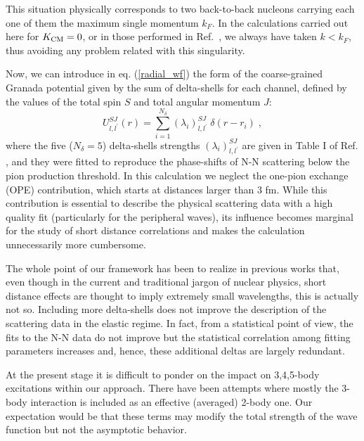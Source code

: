 \documentclass[aps,twocolumn,showpacs,preprintnumbers,amsmath,amssymb,nofootinbib,superscriptaddress,showkeys,noeprint]{revtex4-1}
\begin{document}
This situation physically corresponds to two back-to-back nucleons
carrying each one of them the maximum single momentum $k_F$. In the
calculations carried out here for $K_{\rm CM}=0$, or in those
performed in Ref.~\cite{RuizSimo:2017tcb}, we always have taken
$k<k_F$, thus avoiding any problem related with this singularity.

Now, we can introduce in eq. (\ref{radial_wf}) the form of the
coarse-grained Granada potential given by the sum of delta-shells for
each channel, defined by the values of the total spin $S$ and total
angular momentum $J$:
\begin{equation}\label{delta-shells}
U^{SJ}_{l,l^\prime}(r)= \sum^{N_\delta}_{i=1}
\left(\lambda_i \right)^{SJ}_{l,l^\prime}\; \delta(r-r_i)\;,
\end{equation}
where the five ($N_\delta=5$) delta-shells strengths $\left(\lambda_i
\right)^{SJ}_{l,l^\prime}$ are given in Table I of
Ref. \cite{Perez:2013mwa}, and they were fitted to reproduce the
phase-shifts of N-N scattering below the pion production threshold.
In this calculation we neglect the one-pion exchange (OPE)
contribution, which starts at distances larger than $3$ fm. While this
contribution is essential to describe the physical scattering data
with a high quality fit (particularly for the peripheral waves), its
influence becomes marginal for the study of short distance
correlations and makes the calculation unnecessarily more cumbersome.

The whole point of our framework has been to realize in previous works
that, even though in the current and traditional jargon of nuclear
physics, short distance effects are thought to imply extremely small
wavelengths, this is actually not so.  Including more delta-shells
does not improve the description of the scattering data in the elastic
regime. In fact, from a statistical point of view, the fits to the N-N
data do not improve but the statistical correlation among fitting
parameters increases and, hence, these additional deltas are largely
redundant.


At the present stage it is difficult to ponder on the impact on
3,4,5-body excitations within our approach.  There have been attempts
where mostly the 3-body interaction is included \cite{Moeini:2022fsf,
  HeYeTongLang:2013ihv, Kohno:2012vj, Lovato:2010ef,
  Holt:2009ty,Barnea:2004ac} as an effective (averaged) 2-body
one. Our expectation would be that these terms may modify the total
strength of the wave function but not the asymptotic behavior.
\end{document}
